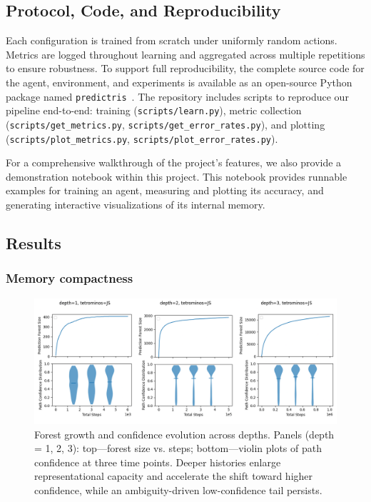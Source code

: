 \documentclass[11pt]{article}
\begin{document}
\subsection{Protocol, Code, and Reproducibility}

Each configuration is trained from scratch under uniformly random actions. Metrics are logged throughout learning and aggregated across multiple repetitions to ensure robustness. To support full reproducibility, the complete source code for the agent, environment, and experiments is available as an open-source Python package named \texttt{predictris}~\cite{predictris-repo}. The repository includes scripts to reproduce our pipeline end-to-end: training (\texttt{scripts/learn.py}), metric collection (\texttt{scripts/get\_metrics.py}, \texttt{scripts/get\_error\_rates.py}), and plotting (\texttt{scripts/plot\_metrics.py}, \hfill \newline \texttt{scripts/plot\_error\_rates.py}).

For a comprehensive walkthrough of the project's features, we also provide a demonstration notebook within this project. This notebook provides runnable examples for training an agent, measuring and plotting its accuracy, and generating interactive visualizations of its internal memory.

\subsection{Results}

\subsubsection{Memory compactness}

\begin{figure}[ht]
\centering
\includegraphics[width=\linewidth]{img/metrics.png}
\caption{Forest growth and confidence evolution across depths. Panels (depth = 1, 2, 3): top—forest size vs. steps; bottom—violin plots of path confidence at three time points. Deeper histories enlarge representational capacity and accelerate the shift toward higher confidence, while an ambiguity-driven low-confidence tail persists.}
\label{fig:metrics}
\end{figure}
\end{document}
